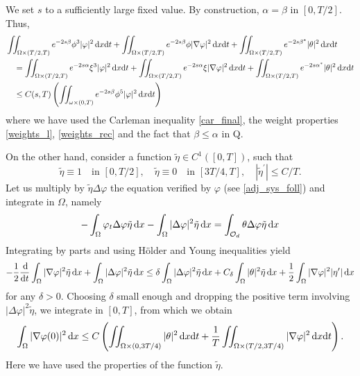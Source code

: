 \documentclass[preprint,10pt]{article}
\numberwithin{equation}{section}
\numberwithin{theorem}{section}
\def\dx{\,\textnormal{d}x}
\def\dt{\textnormal{d}t}
\def\d{\,\textnormal{d}}
\def\dx{\,\textnormal{d}x}
\def\dt{\textnormal{d}t}
\def\d{\,\textnormal{d}}
\begin{document}
{We set $s$ to a sufficiently large fixed value. By construction, $\alpha=\beta$ in $[0,T/2]$. Thus, 
%
\begin{align} \notag 
&\iint_{\Omega\times(T/2,T)}e^{-2s\beta}\phi^3|\varphi|^2\dx\dt+\iint_{\Omega\times(T/2,T)}e^{-2s\beta}\phi|\nabla \varphi|^2\dx\dt+\iint_{\Omega\times(T/2,T)}e^{-2s\beta^*}|\theta|^2\dx\dt  \\ \notag
&\quad = \iint_{\Omega\times(T/2,T)}e^{-2s\alpha}\xi^3|\varphi|^2\dx\dt + \iint_{\Omega\times(T/2,T)}e^{-2s\alpha}\xi|\nabla\varphi|^2\dx\dt + \iint_{\Omega\times(T/2,T)}e^{-2s\alpha^*}|\theta|^2\dx\dt \\ \label{car_rec}
&\quad \leq  C(s,T)\left(\iint_{\omega\times(0,T)}e^{-2s\beta}\phi^5|\varphi|^2\dx\dt\right)
\end{align}
%
where we have used the Carleman inequality \eqref{car_final}, the weight properties \eqref{weights_l}, \eqref{weights_rec} and the fact that $\beta\leq \alpha$ in Q. 

On the other hand, consider a function $\tilde \eta\in C^1([0,T])$, such that 
%
\begin{equation*}
\tilde\eta \equiv 1 \quad\text{in } [0,T/2], \quad \tilde\eta\equiv 0 \quad \text{in } [3T/4,T], \quad |\tilde\eta^\prime|\leq C/T.
\end{equation*}
%
Let us multiply by $\tilde\eta\Delta\varphi$ the equation verified by $\varphi$ (see \eqref{adj_sys_foll}) and integrate in $\Omega$, namely 
%
\begin{equation*}
-\int_{\Omega}\varphi_t\Delta\varphi\tilde\eta\dx-\int_{\Omega}|\Delta \varphi|^2\tilde\eta\dx=\int_{\mathcal O_d}\theta\Delta\varphi\tilde \eta\dx
\end{equation*}
%
Integrating by parts and using H\"older and Young inequalities yield
%
\begin{equation*}
-\frac{1}{2}\frac{\d}{\dt}\int_{\Omega}|\nabla\varphi|^2\tilde\eta\dx+\int_{\Omega}|\Delta\varphi|^2\tilde\eta\dx\leq \delta \int_{\Omega}|\Delta\varphi|^2\tilde\eta\dx+C_\delta\int_{\Omega}|\theta|^2\tilde\eta\dx+\frac{1}{2}\int_{\Omega}|\nabla\varphi|^2|\eta^\prime|\dx
\end{equation*}
%
for any $\delta>0$.  Choosing $\delta$ small enough and dropping the positive term involving $|\Delta\varphi|^2\tilde\eta$, we integrate in $[0,T]$, from which we obtain
%
\begin{equation}\label{nabla_theta_0}
\int_{\Omega}|\nabla\varphi(0)|^2\dx\leq C\left(\iint_{\Omega\times(0,3T/4)}|\theta|^2\dx\dt+\frac{1}{T}\iint_{\Omega\times(T/2,3T/4)}|\nabla\varphi|^2\dx\dt\right).
\end{equation}
%
Here we have used the properties of the function $\tilde\eta$. 

}
\end{document}
